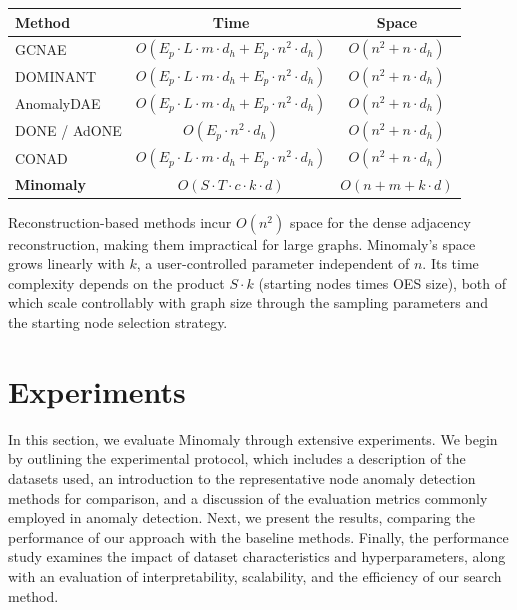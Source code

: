 \documentclass[pdflatex,sn-mathphys-num]{sn-jnl}%
\renewenvironment{table}[1][]%
{\tableorg[#1]%
\tablebodyfont%
\renewcommand\footnotetext[2][]{{\removelastskip\vskip0pt%
\let\tablebodyfont\tablefootnotefont%
\hskip0pt\if!##1!\else{\smash{$^{##1}$}}\fi##2\par}}%
}{\endtableorg}
\theoremstyle{thmstyleone}%
\theoremstyle{thmstyletwo}%
\theoremstyle{thmstylethree}%
\begin{document}
{\begin{table}[H]
\centering
\caption{Asymptotic complexity comparison of graph anomaly detection methods}
\label{tab:complexity_comparison}
\scriptsize
\begin{tabular}{lcc}
\toprule
\textbf{Method} & \textbf{Time} & \textbf{Space} \\
\midrule
GCNAE & $O(E_p \cdot L \cdot m \cdot d_h + E_p \cdot n^2 \cdot d_h)$ & $O(n^2 + n \cdot d_h)$ \\
DOMINANT & $O(E_p \cdot L \cdot m \cdot d_h + E_p \cdot n^2 \cdot d_h)$ & $O(n^2 + n \cdot d_h)$ \\
AnomalyDAE & $O(E_p \cdot L \cdot m \cdot d_h + E_p \cdot n^2 \cdot d_h)$ & $O(n^2 + n \cdot d_h)$ \\
DONE / AdONE & $O(E_p \cdot n^2 \cdot d_h)$ & $O(n^2 + n \cdot d_h)$ \\
CONAD & $O(E_p \cdot L \cdot m \cdot d_h + E_p \cdot n^2 \cdot d_h)$ & $O(n^2 + n \cdot d_h)$ \\
\midrule
\textbf{Minomaly} & $O(S \cdot T \cdot c \cdot k \cdot d)$ & $O(n + m + k \cdot d)$ \\
\bottomrule
\end{tabular}
\end{table}

\noindent Reconstruction-based methods incur $O(n^2)$ space for the dense adjacency reconstruction, making them impractical for large graphs. Minomaly's space grows linearly with $k$, a user-controlled parameter independent of $n$. Its time complexity depends on the product $S \cdot k$ (starting nodes times OES size), both of which scale controllably with graph size through the sampling parameters and the starting node selection strategy.
}

\section{Experiments}
\label{sec:eval}

In this section, we evaluate Minomaly through extensive experiments. We begin by outlining the experimental protocol, which includes a description of the datasets used, an introduction to the representative node anomaly detection methods for comparison, and a discussion of the evaluation metrics commonly employed in anomaly detection. Next, we present the results, comparing the performance of our approach with the baseline methods. Finally, the performance study examines the impact of dataset characteristics and hyperparameters, along with an evaluation of interpretability, scalability, and the efficiency of our search method.
\end{document}
